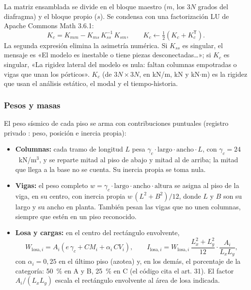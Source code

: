 La matriz ensamblada se divide en el bloque maestro ($m$, los $3N$ grados del diafragma) y el bloque propio ($s$). Se
condensa con una factorización LU de Apache Commons Math 3.6.1:
\begin{equation}
	K_c = K_{mm} - K_{ms}\,K_{ss}^{-1}\,K_{sm}, \qquad K_c \leftarrow \tfrac{1}{2}\left(K_c + K_c^{\mathsf{T}}\right).
	\label{eq:sis-condensacion}
\end{equation}
La segunda expresión elimina la asimetría numérica. Si $K_{ss}$ es singular, el mensaje es «El modelo es inestable o
tiene piezas desconectadas\ldots»; si $K_c$ es singular, «La rigidez lateral del modelo es nula: faltan columnas
empotradas o vigas que unan los pórticos». $K_c$ (de $3N \times 3N$, en kN/m, kN y kN$\cdot$m) es la rigidez que usan el
análisis estático, el modal y el tiempo-historia.

\subsubsection{Pesos y masas}

El peso sísmico de cada piso se arma con contribuciones puntuales (registro privado : peso, posición e
inercia propia):

\begin{itemize}
	\item \textbf{Columnas:} cada tramo de longitud $L$ pesa $\gamma_c \cdot \text{largo} \cdot \text{ancho} \cdot L$, con
	      $\gamma_c = 24$~kN/m$^3$, y se reparte mitad al piso de abajo y mitad al de arriba; la mitad que llega a la base
	      no se cuenta. Su inercia propia se toma nula.
	\item \textbf{Vigas:} el peso completo $w = \gamma_c \cdot \text{largo} \cdot \text{ancho} \cdot \text{altura}$ se asigna
	      al piso de la viga, en su centro, con inercia propia $w\,(L^2 + B^2)/12$, donde $L$ y $B$ son su largo y su ancho
	      en planta.
	      También pesan las vigas que no unen columnas, siempre que estén en un piso reconocido.
	\item \textbf{Losa y cargas:} en el centro del rectángulo envolvente,
	      \begin{equation}
	      	W_{\text{losa},i} = A_i \left(e\,\gamma_c + CM_i + \alpha_i\, CV_i\right), \qquad
	      	I_{\text{losa},i} = W_{\text{losa},i}\, \frac{L_x^2 + L_y^2}{12} \cdot \frac{A_i}{L_x L_y},
	      	\label{eq:sis-losa}
	      \end{equation}
	      con $\alpha_i = 0{,}25$ en el último piso (azotea) y, en los demás, el porcentaje de la categoría: 50~\% en A y B,
	      25~\% en C (el código cita el art. 31). El factor $A_i/(L_x L_y)$ escala el rectángulo envolvente al área de losa
	      indicada.
\end{itemize}

